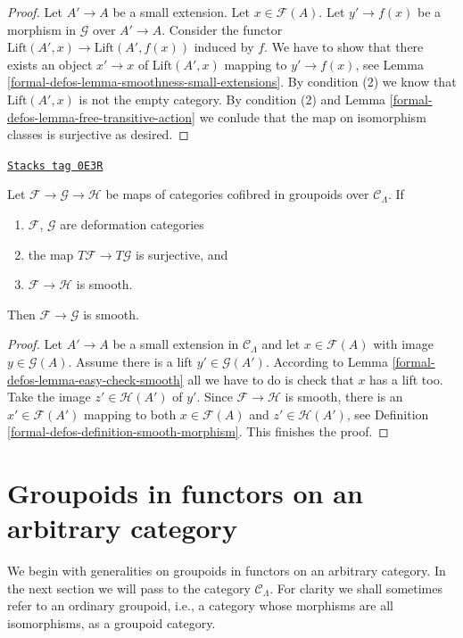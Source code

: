\begin{proof}
Let $A' \to A$ be a small extension. Let $x \in \mathcal{F}(A)$.
Let $y' \to f(x)$ be a morphism in $\mathcal{G}$ over $A' \to A$.
Consider the functor $\text{Lift}(A', x) \to \text{Lift}(A', f(x))$
induced by $f$.
We have to show that there exists an object $x' \to x$
of $\text{Lift}(A', x)$ mapping to $y' \to f(x)$, see
Lemma \ref{formal-defos-lemma-smoothness-small-extensions}.
By condition (2) we know that $\text{Lift}(A', x)$
is not the empty category.
By condition (2) and
Lemma \ref{formal-defos-lemma-free-transitive-action}
we conlude that the map on isomorphism classes
is surjective as desired.
\end{proof}

\begin{lemma}
\label{formal-defos-lemma-map-between-smooth}
\href{https://stacks.math.columbia.edu/tag/0E3R}{\texttt{Stacks tag 0E3R}}

Let $\mathcal{F} \to \mathcal{G} \to \mathcal{H}$ be maps of categories
cofibred in groupoids over $\mathcal{C}_\Lambda$. If
\begin{enumerate}
\item $\mathcal{F}$, $\mathcal{G}$ are deformation categories
\item the map $T\mathcal{F} \to T\mathcal{G}$ is surjective, and
\item $\mathcal{F} \to \mathcal{H}$ is smooth.
\end{enumerate}
Then $\mathcal{F} \to \mathcal{G}$ is smooth.
\end{lemma}

\begin{proof}
Let $A' \to A$ be a small extension in $\mathcal{C}_\Lambda$
and let $x \in \mathcal{F}(A)$ with image $y \in \mathcal{G}(A)$.
Assume there is a lift $y' \in \mathcal{G}(A')$. According to
Lemma \ref{formal-defos-lemma-easy-check-smooth} all we have to do is check
that $x$ has a lift too. Take the image $z' \in \mathcal{H}(A')$
of $y'$. Since $\mathcal{F} \to \mathcal{H}$ is smooth, there is
an $x' \in \mathcal{F}(A')$ mapping to both $x \in \mathcal{F}(A)$
and $z' \in \mathcal{H}(A')$, see
Definition \ref{formal-defos-definition-smooth-morphism}. This finishes the proof.
\end{proof}

\section{Groupoids in functors on an arbitrary category}
\label{formal-defos-section-groupoids-arbitrary}
We begin with generalities on groupoids in functors on an
arbitrary category. In the next section we will
pass to the category $\mathcal{C}_\Lambda$.
For clarity we shall sometimes refer to an ordinary groupoid,
i.e., a category whose morphisms are all isomorphisms, as a groupoid category.

